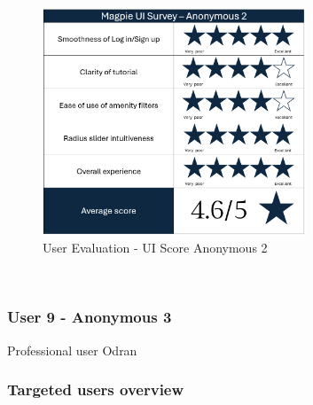 \begin{figure}[h!]
    \centering
    \includegraphics[width=0.7\textwidth]{images/survey-sarah.png}
    \caption{User Evaluation - UI Score Anonymous 2}
\end{figure}\\


\newpage
\subsubsection{User 9 - Anonymous 3}
Professional user Odran

\newpage
\subsubsection{Targeted users overview}